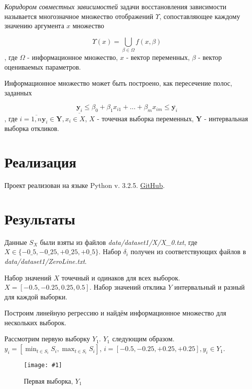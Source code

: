 \documentclass[a4paper,12pt]{article}
\newcommand{\plot}[3]{
    \begin{figure}[H]
        \begin{center}
            \texttt{[image: \#1]}
            \caption{#2}
            \label{#3}
        \end{center}
    \end{figure}
}
\begin{document}
    \textsl{Коридором совместных зависимостей} задачи восстановления зависимости
    называется многозначное множество отображений $ \Upsilon $, сопоставляющее
    каждому значению аргумента $ x $ множество
    
    \begin{equation}
        \Upsilon(x) = \bigcup_{\beta \in \Omega} f(x, \beta)
    \end{equation}
    , где $ \Omega $ - информационное множество, $ x $ - вектор переменных, $ \beta $ - вектор оцениваемых параметров. 

    Информационное множество может быть построено, как пересечение полос, заданных
    
    \begin{equation}
        \underline{\textbf{y}_i} \leq \beta_0 + \beta_1 x_{i1} + ... + \beta_m x_{im} \leq \overline{\textbf{y}_i}
    \end{equation}
    , где $ i = \overline{1, n} \textbf{y}_i \in \textbf{Y}, x_i \in X $, $ X $ - точечная выборка переменных,
    $ \textbf{Y} $ - интервальная выборка откликов.

    \section{Реализация}
    \quad Проект реализован на языке Python v. 3.2.5.
    \href{https://github.com/HellInsider/Intervals_2}{GitHub}.

    \section{Результаты}
    \quad Данные $ S_X $ были взяты из файлов \textsl{data/dataset1/X/X\_0.txt}, \newline
    где $ X \in \{-0\_5, -0\_25, +0\_25, +0\_5 \} $.
    Набор $ \delta_i $ получен из соответствующих файлов в \textsl{data/dataset1/ZeroLine.txt}.

    Набор значений $ X $ точечный и одинаков для всех выборок. \newline
    $ X = [-0.5, -0.25, 0.25, 0.5]  $.
    Набор значений отклика $ Y $ интервальный и разный для каждой выборки.
    
    Построим линейную регрессию и найдём информационное множество для нескольких выборок.

    Рассмотрим первую выборку $ Y_1 $.
    $ Y_1 $ следующим образом. $ y_i = [\min_{t \in S_i}{S_i}, \max_{t \in S_i}{S_i}]$,
    $ i = [-0.5, -0.25, +0.25, +0.25], y_i \in Y_1 $.
    \plot{Y1}{Первая выборка, $ Y_1 $}{p:sampleY1}
\end{document}
